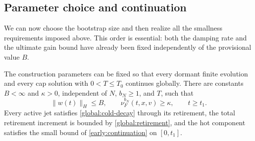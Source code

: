 \subsection{Parameter choice and continuation}

We can now choose the bootstrap size and then realize all the
smallness requirements imposed above.  This order is essential: both
the damping rate and the ultimate gain bound have already been fixed
independently of the provisional value $B$.

\begin{proposition}\label{prop:global-control}
The construction parameters can be fixed so that every dormant finite
evolution and every cap solution with $0<T\le T_0$ continues globally.
There are constants $B<\infty$ and $\kappa>0$, independent of $N$,
$b_N\ge1$, and $T$, such that
\begin{equation}\label{global:uniform-bound}
 \|w(t)\|_H\le B,\qquad \nu_F^{b_N}(t,x,v)\ge\kappa,
 \qquad t\ge t_1.
\end{equation}
Every active jet satisfies \eqref{global:cold-decay} through its
retirement, the total retirement increment is bounded by
\eqref{global:retirement}, and the hot component satisfies the small
bound of \cref{early:continuation} on $[0,t_1]$.
\end{proposition}

